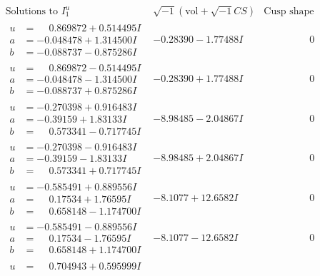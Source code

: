 \documentclass[1p]{elsarticle_modified}
\theoremstyle{definition}
\newcommand{\I}{\sqrt{-1}}
\begin{document}
$$\begin{array}{c|c|c}  
\text{Solutions to }I^u_{1}& \I (\text{vol} + \sqrt{-1}CS) & \text{Cusp shape}\\
 \hline 
\begin{aligned}
u &= \phantom{-}0.869872 + 0.514495 I \\
a &= -0.048478 + 1.314500 I \\
b &= -0.088737 - 0.875286 I\end{aligned}
 & -0.28390 - 1.77488 I & \phantom{-0.000000 } 0 \\ \hline\begin{aligned}
u &= \phantom{-}0.869872 - 0.514495 I \\
a &= -0.048478 - 1.314500 I \\
b &= -0.088737 + 0.875286 I\end{aligned}
 & -0.28390 + 1.77488 I & \phantom{-0.000000 } 0 \\ \hline\begin{aligned}
u &= -0.270398 + 0.916483 I \\
a &= -0.39159 + 1.83133 I \\
b &= \phantom{-}0.573341 - 0.717745 I\end{aligned}
 & -8.98485 - 2.04867 I & \phantom{-0.000000 } 0 \\ \hline\begin{aligned}
u &= -0.270398 - 0.916483 I \\
a &= -0.39159 - 1.83133 I \\
b &= \phantom{-}0.573341 + 0.717745 I\end{aligned}
 & -8.98485 + 2.04867 I & \phantom{-0.000000 } 0 \\ \hline\begin{aligned}
u &= -0.585491 + 0.889556 I \\
a &= \phantom{-}0.17534 + 1.76595 I \\
b &= \phantom{-}0.658148 - 1.174700 I\end{aligned}
 & -8.1077 + 12.6582 I & \phantom{-0.000000 } 0 \\ \hline\begin{aligned}
u &= -0.585491 - 0.889556 I \\
a &= \phantom{-}0.17534 - 1.76595 I \\
b &= \phantom{-}0.658148 + 1.174700 I\end{aligned}
 & -8.1077 - 12.6582 I & \phantom{-0.000000 } 0 \\ \hline\begin{aligned}
u &= \phantom{-}0.704943 + 0.595999 I \\

\end{aligned}
\end{array}$$
\end{document}
